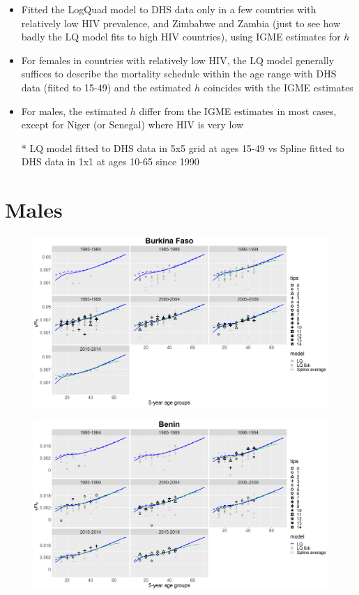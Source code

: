\documentclass[12pt,a4paper]{article}
\date{\vspace{-5ex}}
\begin{document}
\begin{itemize}
\item Fitted the LogQuad model to DHS data only in a few countries with relatively low HIV prevalence, and Zimbabwe and Zambia (just to see how badly the LQ model fits to high HIV countries), using IGME estimates for $h$
\item For females in countries with relatively low HIV, the LQ model generally suffices to describe the mortality schedule within the age range with DHS data (fiited to 15-49) and the estimated $h$ coincides with the IGME estimates
\item For males, the estimated $h$ differ from the IGME estimates in most cases, except for Niger (or Senegal) where HIV is very low
\item[*] LQ model fitted to DHS data in 5x5 grid at ages 15-49 vs Spline fitted to DHS data in 1x1 at ages 10-65 since 1990
\end{itemize}

\newpage
\section*{\centering Males}
\begin{figure}[H]
\includegraphics[width = \linewidth]{Burkina Faso/8/burkina faso males.png}
\end{figure}
\begin{figure}[H]
\includegraphics[width = \linewidth]{Burkina Faso/8/benin males.png}
\end{figure}
\end{document}
